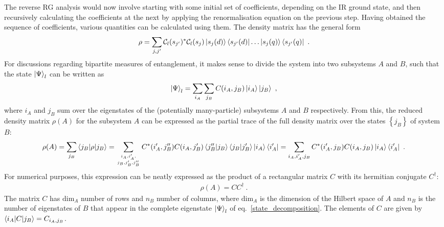 \documentclass[prb]{revtex4-2}
\begin{document}
The reverse RG analysis would now involve starting with some initial set of coefficients, depending on the IR ground state, and then recursively calculating the coefficients at the next by applying the renormalisation equation on the previous step. Having obtained the sequence of coefficients, various quantities can be calculated using them. The density matrix has the general form
\begin{equation}\begin{aligned}
\rho = \sum_{j,j^\prime}\mathcal{C}_l(s_{j^\prime})^*\mathcal{C}_l(s_{j}) \ket{s_j(d)}\bra{s_{j^\prime}(d)}\ldots\ket{s_j(q)}\bra{s_{j^\prime}(q)}~.
\end{aligned}\end{equation}
For discussions regarding bipartite measures of entanglement, it makes sense to divide the system into two subsystems \(A\) and \(B\), such that the state \(\ket{\Psi}_l\) can be written as
\begin{equation}\begin{aligned}
	\label{state_decomposition}
	\ket{\Psi}_l = \sum_{i_A}\sum_{j_B}C(i_A, j_B)\ket{i_A}\ket{j_B}~,
\end{aligned}\end{equation}
where \(i_A\) and \(j_B\) sum over the eigenstates of the (potentially many-particle) subsystems \(A\) and \(B\) respectively. From this, the reduced density matrix \(\rho(A)\) for the subsystem \(A\) can be expressed as the partial trace of the full density matrix over the states \(\left\{j_B\right\} \) of system \(B\):
\begin{equation}\begin{aligned}
	\rho(A) = \sum_{j_B}\braket{j_B | \rho | j_B} = \sum_{i_A, i^\prime_A,\atop{j_B, j^\prime_B, j^{\prime\prime}_B}} C^*(i_A^\prime, j_B^{\prime\prime})C(i_A, j_B^{\prime})\braket{j^{\prime\prime}_B | j_B}\braket{j_B | j^{\prime}_B}\ket{i_A}\bra{i^\prime_A} = \sum_{i_A, i^\prime_A, j_B}C^*(i^\prime_A, j_B)C(i_A, j_B)\ket{i_A}\bra{i_A^\prime}~.
\end{aligned}\end{equation}
For numerical purposes, this expression can be neatly expressed as the product of a rectangular matrix \(C\) with its hermitian conjugate \(C^\dagger\):
\begin{equation}\begin{aligned}
	\rho(A) = C C^\dagger~.
\end{aligned}\end{equation}
The matrix \(C\) has \(\text{dim}_A\) number of rows and \(n_B\) number of columns, where \(\text{dim}_A\) is the dimension of the Hilbert space of \(A\) and \(n_{B}\) is the number of eigenstates of \(B\) that appear in the complete eigenstate \(\ket{\Psi}_l\) of eq.~\ref{state_decomposition}. The elements of \(C\) are given by \(\braket{i_A | C | j_B} = C_{i_A, j_B}\).
\end{document}
